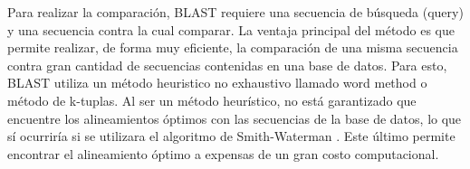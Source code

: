 






Para realizar la comparación, BLAST requiere una secuencia de búsqueda (query) y una secuencia contra la cual comparar.
La ventaja principal del método es que permite realizar, de forma muy eficiente, la comparación de una misma secuencia contra gran cantidad de secuencias contenidas en una base de datos.
Para esto, BLAST utiliza un método heuristico no exhaustivo llamado word method o método de k-tuplas.
Al ser un método heurístico, no está garantizado que encuentre los alineamientos óptimos con las secuencias de la base de datos, lo que sí ocurriría si se utilizara el algoritmo de Smith-Waterman \cite{smith1981identification}.
Este último permite encontrar el alineamiento óptimo a expensas de un gran costo computacional.

